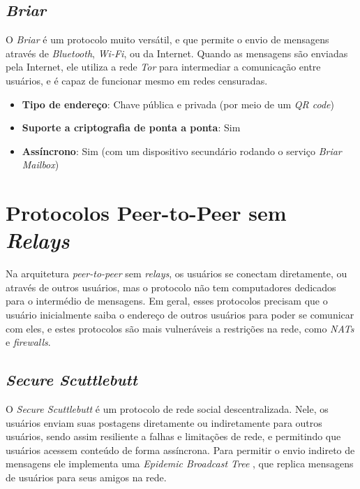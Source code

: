 \subsection{\textit{Briar}}

O \textit{Briar} é um protocolo muito versátil, e que permite o envio de mensagens através de \textit{Bluetooth}, \textit{Wi-Fi}, ou da Internet. Quando as mensagens são enviadas pela Internet, ele utiliza a rede \textit{Tor} para intermediar a comunicação entre usuários, e é capaz de funcionar mesmo em redes censuradas. \cite{briar}

\begin{itemize}
  \item \textbf{Tipo de endereço}: Chave pública e privada (por meio de um \textit{QR code})
  \item \textbf{Suporte a criptografia de ponta a ponta}: Sim
  \item \textbf{Assíncrono}: Sim (com um dispositivo secundário rodando o serviço \textit{Briar Mailbox})
\end{itemize}

\section{Protocolos Peer-to-Peer sem \textit{Relays}}

Na arquitetura \textit{peer-to-peer} sem \textit{relays}, os usuários se conectam diretamente, ou através de outros usuários, mas o protocolo não tem computadores dedicados para o intermédio de mensagens. Em geral, esses protocolos precisam que o usuário inicialmente saiba o endereço de outros usuários para poder se comunicar com eles, e estes protocolos são mais vulneráveis a restrições na rede, como \textit{NATs} e \textit{firewalls}.

\subsection{\textit{Secure Scuttlebutt}}

O \textit{Secure Scuttlebutt} é um protocolo de rede social descentralizada. Nele, os usuários enviam suas postagens diretamente ou indiretamente para outros usuários, sendo assim resiliente a falhas e limitações de rede, e permitindo que usuários acessem conteúdo de forma assíncrona. Para permitir o envio indireto de mensagens ele implementa uma \textit{Epidemic Broadcast Tree} \citep{ebtpaper}, que replica mensagens de usuários para seus amigos na rede. \citep{scuttlebutt}

